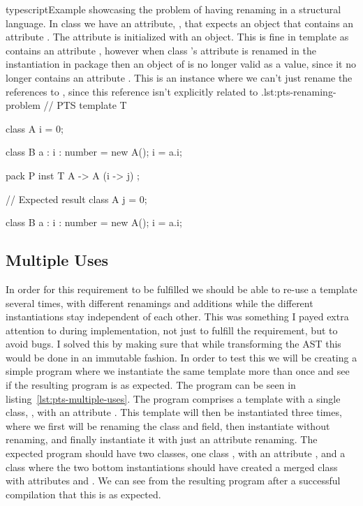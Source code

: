 \begin{code}{typescript}{Example showcasing the problem of having renaming in a structural language. In class  we have an attribute, , that expects an object that contains an attribute . The attribute is initialized with an  object. This is fine in template  as  contains an attribute , however when class 's attribute is renamed in the instantiation in package  then an object of  is no longer valid as a value, since it no longer contains an attribute . This is an instance where we can't just rename the references to , since this reference isn't explicitly related to .}{lst:pts-renaming-problem}
    // PTS
    template T {
        class A {
            i = 0;
        }

        class B {
            a : { i : number } = new A();
            i = a.i;
        }
    }

    pack P {
        inst T { A -> A (i -> j) };
    }

    // Expected result
    class A {
        j = 0;
    }

    class B {
        a : { i : number } = new A();
        i = a.i;
    }
\end{code}

\subsection{Multiple Uses}\label{subsec:pts-multiple-uses}

In order for this requirement to be fulfilled we should be able to re-use a template several times, with different renamings and additions while the different instantiations stay independent of each other.
This was something I payed extra attention to during implementation, not just to fulfill the requirement, but to avoid bugs.
I solved this by making sure that while transforming the AST this would be done in an immutable fashion.
In order to test this we will be creating a simple program where we instantiate the same template more than once and see if the resulting program is as expected.
The program can be seen in listing~\vref{lst:pts-multiple-uses}.
The program comprises a template  with a single class, , with an attribute .
This template will then be instantiated three times, where we first will be renaming the class and field, then instantiate without renaming, and finally instantiate it with just an attribute renaming.
The expected program should have two classes, one class , with an attribute , and a class  where the two bottom instantiations should have created a merged class with attributes  and .
We can see from the resulting program after a successful compilation that this is as expected.

